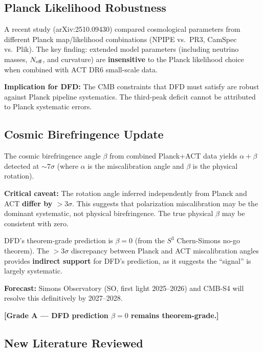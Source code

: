 \documentclass[11pt]{article}
\begin{document}
\subsection{Planck Likelihood Robustness}

A recent study (arXiv:2510.09430) compared cosmological parameters from
different Planck map/likelihood combinations (NPIPE vs.\ PR3, CamSpec vs.\
Plik). The key finding: extended model parameters (including neutrino masses,
$N_{\rm eff}$, and curvature) are \textbf{insensitive} to the Planck
likelihood choice when combined with ACT DR6 small-scale data.

\textbf{Implication for DFD:} The CMB constraints that DFD must satisfy
are robust against Planck pipeline systematics. The third-peak deficit
cannot be attributed to Planck systematic errors.

\subsection{Cosmic Birefringence Update}

The cosmic birefringence angle $\beta$ from combined Planck+ACT data
yields $\alpha + \beta$ detected at $\sim 7\sigma$ (where $\alpha$ is
the miscalibration angle and $\beta$ is the physical rotation).

\textbf{Critical caveat:} The rotation angle inferred independently from
Planck and ACT \textbf{differ by $> 3\sigma$}. This suggests that
polarization miscalibration may be the dominant systematic, not physical
birefringence. The true physical $\beta$ may be consistent with zero.

DFD's theorem-grade prediction is $\beta = 0$ (from the $S^3$ Chern-Simons
no-go theorem). The $> 3\sigma$ discrepancy between Planck and ACT
miscalibration angles provides \textbf{indirect support} for DFD's
prediction, as it suggests the ``signal'' is largely systematic.

\textbf{Forecast:} Simons Observatory (SO, first light 2025--2026) and
CMB-S4 will resolve this definitively by 2027--2028.

\textbf{[Grade A --- DFD prediction $\beta = 0$ remains theorem-grade.]}

\subsection{New Literature Reviewed}
\end{document}
